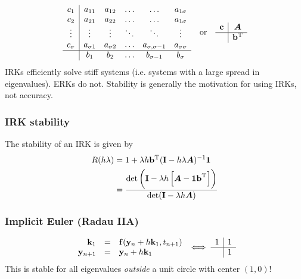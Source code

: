 \documentclass[a4paper, 12pt]{article}
\begin{document}
\begin{equation}
\begin{array}{c|ccccc}
c_1      & a_{11}       & a_{12}       & \dots  & \dots               & a_{1\sigma}      \\
c_2      & a_{21}       & a_{22}       & \dots  & \dots               & a_{1\sigma}      \\
\vdots   & \vdots       & \vdots       & \ddots & \ddots              & \vdots           \\
c_\sigma & a_{\sigma 1} & a_{\sigma 2} & \dots  & a_{\sigma,\sigma-1} & a_{\sigma\sigma} \\ \hline
         & b_1          & b_2          & \dots & b_{\sigma-1}         & b_\sigma         \\
\end{array}
\quad \text{or} \quad
\begin{array}{c|c}
    \mathbf{c} & \bm{A}   \\ \hline
          & \mathbf{b}^{\text{T}} \\
\end{array}
\end{equation}
IRKs efficiently solve stiff systems (i.e. systems with a large spread in eigenvalues). ERKs do not. Stability is generally the motivation for using IRKs, not accuracy.

\subsubsection{IRK stability}
The stability of an IRK is given by
\begin{align}
	R(h\lambda)	&= 1 + \lambda h \mathbf{b}^{\text{T}} ( \mathbf{I} - h \lambda \bm{A} )^{-1} \mathbf{1} \\
				&= \frac{
					\det \left( \mathbf{I} - \lambda h \left[ \bm{A} - \mathbf{1b}^{\text{T}} \right] \right)
					}{
					\det ( \mathbf{I} - \lambda h \bm{A} )
					}
\end{align}

\subsubsection{Implicit Euler (Radau IIA)}
\begin{equation}
	\begin{array}{rcl}
		\mathbf{k}_1  &=& \mathbf{f}(\mathbf{y}_n + h \mathbf{k}_1, t_{n+1}) \\
		\mathbf{y}_{n+1} &=& \mathbf{y}_n + h \mathbf{k}_1 \\
	\end{array}
	\iff
	\begin{array}{c|c}
		1 & 1 \\ \hline
		  & 1 \\
	\end{array}
\end{equation}
This is stable for all eigenvalues \emph{outside} a unit circle with center \((1, 0)\)!
\end{document}

